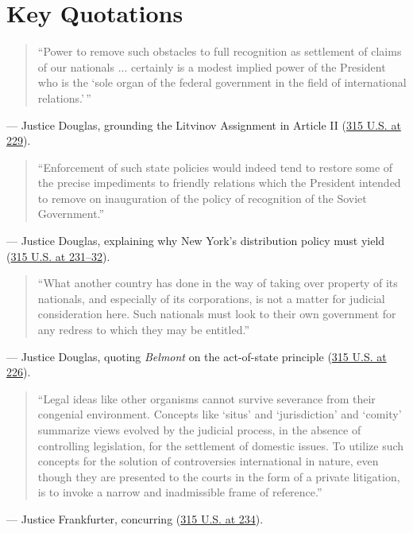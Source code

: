 \documentclass[12pt]{article}
\begin{document}
\section{Key Quotations}
\begin{quote}
``Power to remove such obstacles to full recognition as settlement of claims of our nationals ... certainly is a modest implied power of the President who is the `sole organ of the federal government in the field of international relations.'\,''
\end{quote}
\noindent --- Justice Douglas, grounding the Litvinov Assignment in Article II (\href{https://www.law.cornell.edu/supremecourt/text/315/203}{315 U.S. at 229}).

\begin{quote}
``Enforcement of such state policies would indeed tend to restore some of the precise impediments to friendly relations which the President intended to remove on inauguration of the policy of recognition of the Soviet Government.''
\end{quote}
\noindent --- Justice Douglas, explaining why New York's distribution policy must yield (\href{https://caselaw.findlaw.com/court/us-supreme-court/315/203.html}{315 U.S. at 231--32}).

\begin{quote}
``What another country has done in the way of taking over property of its nationals, and especially of its corporations, is not a matter for judicial consideration here. Such nationals must look to their own government for any redress to which they may be entitled.''
\end{quote}
\noindent --- Justice Douglas, quoting \textit{Belmont} on the act-of-state principle (\href{https://supreme.justia.com/cases/federal/us/315/203/}{315 U.S. at 226}).

\begin{quote}
``Legal ideas like other organisms cannot survive severance from their congenial environment. Concepts like `situs' and `jurisdiction' and `comity' summarize views evolved by the judicial process, in the absence of controlling legislation, for the settlement of domestic issues. To utilize such concepts for the solution of controversies international in nature, even though they are presented to the courts in the form of a private litigation, is to invoke a narrow and inadmissible frame of reference.''
\end{quote}
\noindent --- Justice Frankfurter, concurring (\href{https://caselaw.findlaw.com/court/us-supreme-court/315/203.html}{315 U.S. at 234}).
\end{document}
